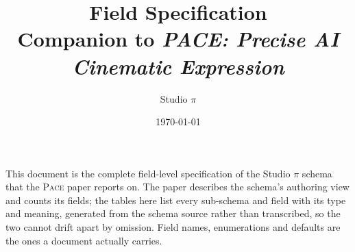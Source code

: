 \documentclass[11pt]{article}
\title{\textbf{\pai{} Field Specification} \\
\large Companion to \emph{PACE: Precise AI Cinematic Expression}}
\author{Studio $\pi$}
\date{\today}
\newcommand{\pai}{\texorpdfstring{Studio $\pi$}{Studio pi}\xspace}
\newcommand{\pace}{\textsc{Pace}\xspace}
\begin{document}
\maketitle

\noindent This document is the complete field-level specification of the
\pai{} schema that the \pace{} paper reports on. The paper describes the
schema's authoring view and counts its fields; the tables here
list every sub-schema and field with its type and meaning, generated from the
schema source rather than transcribed, so the two cannot drift apart by
omission. Field names, enumerations and defaults are the ones a document
actually carries.


\end{document}
